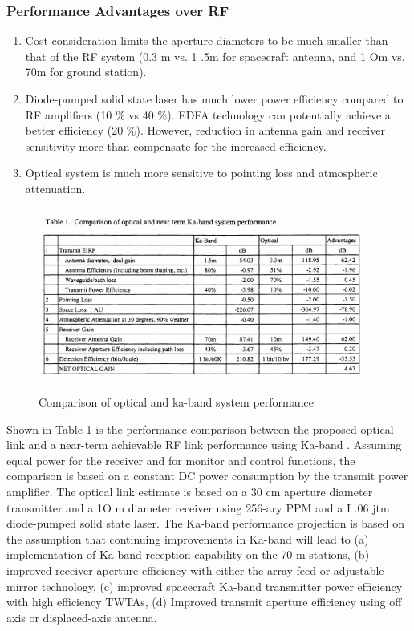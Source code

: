 \subsubsection{Performance Advantages over RF}

\begin{enumerate}
	\item Cost consideration limits the aperture diameters to be much smaller than that of the RF system (0.3 m vs. 1 .5m for spacecraft antenna, and 1 Om vs. 70m for ground station). 
	\item Diode-pumped solid state laser has much lower power efficiency compared to RF amplifiers (10 \% vs 40 \%). EDFA technology can potentially achieve a better efficiency (20 \%). However, reduction in antenna gain and receiver sensitivity more than compensate for the increased efficiency. 
	\item Optical system is much more sensitive to pointing loss and atmospheric attenuation.
\end{enumerate}
\begin{figure}[htb]
\begin{center}
\includegraphics[width=1\columnwidth]{figures/laser-communication/bh3.jpg}
\caption{Comparison of optical and ka-band system performance}
\end{center}
\end{figure}
\noindent
Shown in Table 1 is the performance comparison between the proposed optical link and a near-term achievable RF link performance using Ka-band \cite{comparison}. Assuming equal power for the receiver and for monitor and control functions, the comparison is based on a constant DC power consumption by the transmit power amplifier. The optical link estimate is based on a 30 cm aperture diameter transmitter and a 1O m diameter receiver using 256-ary PPM and a I .06 jtm diode-pumped solid state laser. The Ka-band performance projection is based on the assumption that continuing improvements in Ka-band will lead to 
(a) implementation of Ka-band reception capability on the 70 m stations,
 (b) improved receiver aperture efficiency with either
the array feed or adjustable mirror technology, 
(c) improved spacecraft Ka-band transmitter power efficiency with high efficiency TWTAs, 
(d) Improved transmit aperture efficiency using off axis or displaced-axis antenna.

